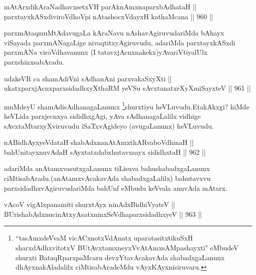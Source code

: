 
\begin{shl}
mAtArxdikAraNadhavxsetxVH parAknAmxnaparxbAdhataH || \\
parxtayxkASxdiviroVdhoV\s pi nAtashocxVdayxH kathaMcana \hfill || 960 ||  
\end{shl}

\begin{artha}
parxmAtaqmuMtAdavugaLa kAraNavu nAshavAgiruvudariMda bAhayx viSayada parxmANagaLige nivaqtitxyAgiruvudu, adariMda parxtayxkASxdi parxmANa viroVdhavanunx (I tatavxjAcnxnakekx)yAvariVtiyalUlx parxshinxsabAradu.
\end{artha}

\begin{shl}
udakeVR ca shamAdiVni sAdhanAni parxvakaSxyXti || \\
ukatxparxjAcnxparxsidadhxyXthaRM yeVSu sAvxtanatxrXyXmiSayxteV \hfill || 961 ||  
\end{shl}

\begin{artha}
muMdeyU shamAdisAdhanagaLanunx \footnote{``tasAmxdeVvaM vicACxnotxVdAnatx uparatasitxtikuSxH sharxdAdhxvitotxV BUtAvx\s\s tamxneyxVvA\s\s tAmxsAMpashayxti" eMbudeV shurxti BataqRparxpaMcaru devxYtavAcakavAda shabadxgaLanunx dhAyxnakAladalilx ciMtisabAradeMdu vAyxKAyxnisiruvaru.}shurxtiyu heVLuvudu.\break EtakAkxgi? hiMde heVLida parxjecnxya sididhxgAgi, yAva sAdhanagaLalilx vidhige sAvxtaMtarxyXviruvudu iSaTxvAgideyo (avugaLanunx) heVLuvudu.
\end{artha}


\begin{shl}
nABidhAyxyeVdataH shabAdxnanAtAmxthARvaboVdhinaH || \\
bahUnitayxnuvAdaH sAyxtatxdabxhutavxsayx sididhxtaH \hfill || 962 || 
\end{shl}

\begin{artha}
adariMda anAtamxvasutxgaLanunx tiLisuva bahushabadxgaLanunx ciMtisabAradu.(anAtamxvAcakavAda shabadxgaLalilx) bahutavxvu parxsidadhxvAgiruvudariMda bahUnf eMbudu keVvala anuvAda mAtarx.
\end{artha}

\begin{shl}
vAcoV vigAlxpanamiti shurxtAyx ninAdx\s BidhiVyateV ||  \\
BUrishabAdxnucinAtxyAsatxninxSeVdhaparxsidadhxyeV \hfill || 963 ||  
\end{shl}

